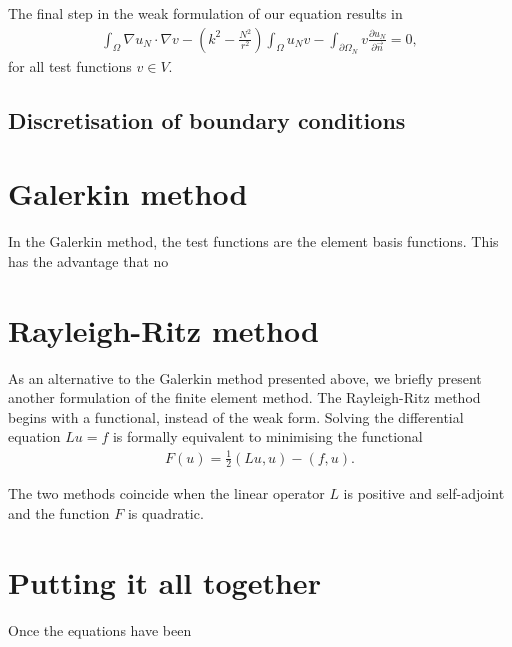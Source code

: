 The final step in the weak formulation of our equation results in
\begin{align}
	\int_\Omega \nabla u_N \cdot \nabla v - \left(k^2 - \frac{N^2}{r^2}\right) \int_\Omega u_N v - \int_{\partial\Omega_N} v \frac{\partial u_N}{\partial \vec{n}} = 0,
\end{align}
for all test functions $v\in V$.







\subsection{Discretisation of boundary conditions}

\iffalse 
What are the boundary conditions that we have?
Sommerfeld, Neumann, PML..
How do we discretise these?
\fi







\section{Galerkin method}

In the Galerkin method, the test functions are the element basis functions.
This has the advantage that no 





\section{Rayleigh-Ritz method}

As an alternative to the Galerkin method presented above, we briefly present another formulation of the finite element method.
The Rayleigh-Ritz method begins with a functional, instead of the weak form.
Solving the differential equation $Lu=f$ is formally equivalent to minimising the functional
\begin{align}
	F(u) = \frac{1}{2}\left( Lu, u \right) - \left( f, u \right).
\end{align}

The two methods coincide when the linear operator $L$ is positive and self-adjoint and the function $F$ is quadratic.





\section{Putting it all together}

Once the equations have been 